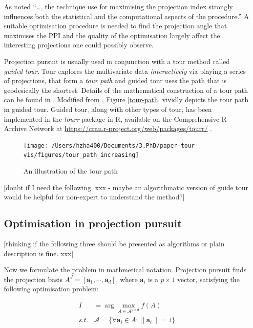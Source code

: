 \documentclass[12pt]{article}
\begin{document}
As \citet{friedman1974projection} noted ``\ldots{}, the technique use
for maximising the projection index strongly influences both the
statistical and the computational aspects of the procedure.'' A suitable
optimisation procedure is needed to find the projection angle that
maximises the PPI and the quality of the optimisation largely affect the
interesting projections one could possibly observe.

Projection pursuit is usually used in conjunction with a tour method
called \emph{guided tour}. Tour explores the multivariate data
\emph{interactively} via playing a series of projections, that form a
\emph{tour path} and guided tour uses the path that is geodesically the
shortest. Details of the mathematical construction of a tour path can be
found in \citet{buja2005computational}. Modified from
\citet{buja2005computational}, Figure \ref{tour-path} vividly depicts
the tour path in guided tour. Guided tour, along with other types of
tour, has been implemented in the \emph{tourr} package in R, available
on the Comprehensive R Archive Network at
\url{https://cran.r-project.org/web/packages/tourr/}
\citep{wickham2011tourrpackage}.

\begin{figure}
\texttt{[image: /Users/hzha400/Documents/3.PhD/paper-tour-vis/figures/tour\_path\_increasing]} \caption{\label{tour-path}An illustration of the tour path}\label{fig:tour-path}
\end{figure}

{[}doubt if I need the following. xxx - maybe an algorithmatic version
of guide tour would be helpful for non-expert to understand the
method?{]}

\hypertarget{optimisation-in-projection-pursuit}{%
\subsection{Optimisation in projection
pursuit}\label{optimisation-in-projection-pursuit}}

{[}thinking if the following three should be presented as algorithms or
plain description is fine. xxx{]}

Now we formulate the problem in mathmetical notation. Projection pursuit
finds the projection basis
\(A^J = [\mathbf{a}_1, \cdots, \mathbf{a}_d]\), where \(\mathbf{a}_i\)
is a \(p \times 1\) vector, satisfying the following optimisation
problem:

\begin{align}
I &= \arg \max_{A \in \mathcal{A}^{p \times d}} f(A) \\
s.t. & \mathcal{A} = \{ \forall \mathbf{a}_i \in A: \lVert \mathbf{a}_i \rVert = 1 \}
\end{align}
\end{document}

